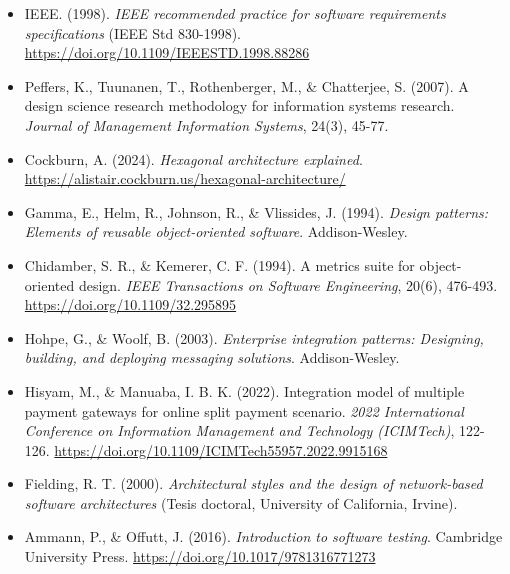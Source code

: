 \documentclass[10pt]{article}
\begin{document}
\begin{itemize}
  \item IEEE. (1998). \textit{IEEE recommended practice for software requirements specifications} (IEEE Std 830-1998). \url{https://doi.org/10.1109/IEEESTD.1998.88286}
  \item Peffers, K., Tuunanen, T., Rothenberger, M., \& Chatterjee, S. (2007). A design science research methodology for information systems research. \textit{Journal of Management Information Systems}, 24(3), 45-77.
  \item Cockburn, A. (2024). \textit{Hexagonal architecture explained}. \url{https://alistair.cockburn.us/hexagonal-architecture/}
  \item Gamma, E., Helm, R., Johnson, R., \& Vlissides, J. (1994). \textit{Design patterns: Elements of reusable object-oriented software}. Addison-Wesley.
  \item Chidamber, S. R., \& Kemerer, C. F. (1994). A metrics suite for object-oriented design. \textit{IEEE Transactions on Software Engineering}, 20(6), 476-493. \url{https://doi.org/10.1109/32.295895}
  \item Hohpe, G., \& Woolf, B. (2003). \textit{Enterprise integration patterns: Designing, building, and deploying messaging solutions}. Addison-Wesley.
  \item Hisyam, M., \& Manuaba, I. B. K. (2022). Integration model of multiple payment gateways for online split payment scenario. \textit{2022 International Conference on Information Management and Technology (ICIMTech)}, 122-126. \url{https://doi.org/10.1109/ICIMTech55957.2022.9915168}
  \item Fielding, R. T. (2000). \textit{Architectural styles and the design of network-based software architectures} (Tesis doctoral, University of California, Irvine).
  \item Ammann, P., \& Offutt, J. (2016). \textit{Introduction to software testing}. Cambridge University Press. \url{https://doi.org/10.1017/9781316771273}
\end{itemize}
\end{document}

